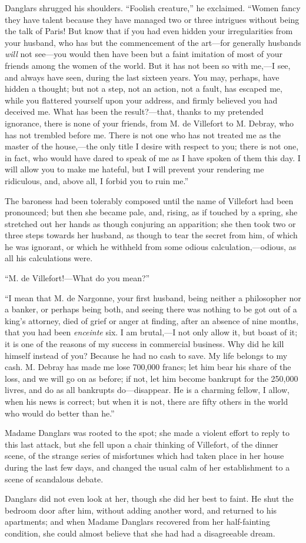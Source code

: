 Danglars shrugged his shoulders. “Foolish creature,” he exclaimed.
“Women fancy they have talent because they have managed two or three
intrigues without being the talk of Paris! But know that if you had
even hidden your irregularities from your husband, who has but the
commencement of the art—for generally husbands \textit{will} not see—you would
then have been but a faint imitation of most of your friends among the
women of the world. But it has not been so with me,—I see, and always
have seen, during the last sixteen years. You may, perhaps, have hidden
a thought; but not a step, not an action, not a fault, has escaped me,
while you flattered yourself upon your address, and firmly believed you
had deceived me. What has been the result?—that, thanks to my pretended
ignorance, there is none of your friends, from M. de Villefort to M.
Debray, who has not trembled before me. There is not one who has not
treated me as the master of the house,—the only title I desire with
respect to you; there is not one, in fact, who would have dared to
speak of me as I have spoken of them this day. I will allow you to make
me hateful, but I will prevent your rendering me ridiculous, and, above
all, I forbid you to ruin me.”

The baroness had been tolerably composed until the name of Villefort
had been pronounced; but then she became pale, and, rising, as if
touched by a spring, she stretched out her hands as though conjuring an
apparition; she then took two or three steps towards her husband, as
though to tear the secret from him, of which he was ignorant, or which
he withheld from some odious calculation,—odious, as all his
calculations were.

“M. de Villefort!—What do you mean?”

“I mean that M. de Nargonne, your first husband, being neither a
philosopher nor a banker, or perhaps being both, and seeing there was
nothing to be got out of a king’s attorney, died of grief or anger at
finding, after an absence of nine months, that you had been \textit{enceinte}
six. I am brutal,—I not only allow it, but boast of it; it is one of
the reasons of my success in commercial business. Why did he kill
himself instead of you? Because he had no cash to save. My life belongs
to my cash. M. Debray has made me lose 700,000 francs; let him bear his
share of the loss, and we will go on as before; if not, let him become
bankrupt for the 250,000 livres, and do as all bankrupts do—disappear.
He is a charming fellow, I allow, when his news is correct; but when it
is not, there are fifty others in the world who would do better than
he.”

Madame Danglars was rooted to the spot; she made a violent effort to
reply to this last attack, but she fell upon a chair thinking of
Villefort, of the dinner scene, of the strange series of misfortunes
which had taken place in her house during the last few days, and
changed the usual calm of her establishment to a scene of scandalous
debate.

Danglars did not even look at her, though she did her best to faint. He
shut the bedroom door after him, without adding another word, and
returned to his apartments; and when Madame Danglars recovered from her
half-fainting condition, she could almost believe that she had had a
disagreeable dream.
